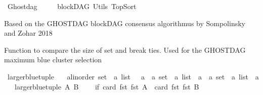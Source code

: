 %
\begin{isabellebody}%
%
%
\isadelimtheory
\isanewline
%
\endisadelimtheory
%
\isatagtheory
{}\isamarkupfalse%
\ Ghostdag\ \ \isanewline
\ \ \ blockDAG\ Utils\ TopSort\isanewline
{}%
\endisatagtheory
{\isafoldtheory}%
%
\isadelimtheory
%
\endisadelimtheory
%
\isadelimdocument
%
\endisadelimdocument
%
\isatagdocument
%
\isamarkuptrue%
%
\endisatagdocument
{\isafolddocument}%
%
\isadelimdocument
%
\endisadelimdocument
%
\begin{isamarkuptext}%
Based on the GHOSTDAG blockDAG consensus algorithmus by Sompolinsky and Zohar 2018%
\end{isamarkuptext}\isamarkuptrue%
%
\isadelimdocument
%
\endisadelimdocument
%
\isatagdocument
%
\isamarkuptrue%
%
\endisatagdocument
{\isafolddocument}%
%
\isadelimdocument
%
\endisadelimdocument
%
\begin{isamarkuptext}%
Function to compare the size of set and break ties. Used for the GHOSTDAG maximum blue 
      cluster selection%
\end{isamarkuptext}\isamarkuptrue%
\isamarkupfalse%
\ larger{\isacharunderscore}{\kern0pt}blue{\isacharunderscore}{\kern0pt}tuple\ {\isacharcolon}{\kern0pt}{\isacharcolon}{\kern0pt}\isanewline
\ \ {\isachardoublequoteopen}{\isacharparenleft}{\kern0pt}{\isacharparenleft}{\kern0pt}{\isacharprime}{\kern0pt}a{\isacharcolon}{\kern0pt}{\isacharcolon}{\kern0pt}linorder\ set\ {\isasymtimes}\ {\isacharprime}{\kern0pt}a\ list{\isacharparenright}{\kern0pt}\ \ {\isasymtimes}\ {\isacharprime}{\kern0pt}a{\isacharparenright}{\kern0pt}\ {\isasymRightarrow}\ {\isacharparenleft}{\kern0pt}{\isacharparenleft}{\kern0pt}{\isacharprime}{\kern0pt}a\ set\ {\isasymtimes}\ {\isacharprime}{\kern0pt}a\ list{\isacharparenright}{\kern0pt}\ {\isasymtimes}\ {\isacharprime}{\kern0pt}a{\isacharparenright}{\kern0pt}\ {\isasymRightarrow}\ {\isacharparenleft}{\kern0pt}{\isacharparenleft}{\kern0pt}{\isacharprime}{\kern0pt}a\ set\ {\isasymtimes}\ {\isacharprime}{\kern0pt}a\ list{\isacharparenright}{\kern0pt}\ {\isasymtimes}\ {\isacharprime}{\kern0pt}a{\isacharparenright}{\kern0pt}{\isachardoublequoteclose}\isanewline
\ \ \ {\isachardoublequoteopen}larger{\isacharunderscore}{\kern0pt}blue{\isacharunderscore}{\kern0pt}tuple\ A\ B\ {\isacharequal}{\kern0pt}\ \isanewline
\ \ {\isacharparenleft}{\kern0pt}if\ {\isacharparenleft}{\kern0pt}card\ {\isacharparenleft}{\kern0pt}fst\ {\isacharparenleft}{\kern0pt}fst\ A{\isacharparenright}{\kern0pt}{\isacharparenright}{\kern0pt}{\isacharparenright}{\kern0pt}\ {\isachargreater}{\kern0pt}\ {\isacharparenleft}{\kern0pt}card\ {\isacharparenleft}{\kern0pt}fst\ {\isacharparenleft}{\kern0pt}fst\ B{\isacharparenright}{\kern0pt}{\isacharparenright}{\kern0pt}{\isacharparenright}{\kern0pt}\ {\isasymor}\ \isanewline

\end{isabellebody}
